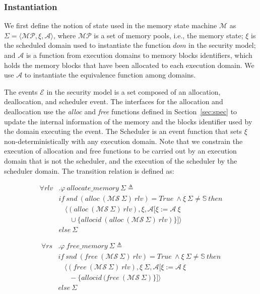 \subsubsection{Instantiation}

We first define the notion of state used in the memory state machine $\mathcal{M}$ as $\Sigma = \langle \mathcal{MP}, \xi, \mathcal{A} \rangle$, where $\mathcal{MP}$ is a set of memory pools, i.e., the memory state; $\xi$ is the scheduled domain used to instantiate the function $dom$ in the security model; and $\mathcal{A}$ is a function from execution domains to memory blocks identifiers, which holds the memory blocks that have been allocated to each execution domain. We use  $\mathcal{A}$  to instantiate the equivalence function among domains.


The events $\mathcal{E}$ in the security model is a set composed of an allocation, deallocation, and scheduler event. The interfaces for the allocation and deallocation use the \emph{alloc} and \emph{free} functions defined in Section~\ref{sec:spec} to update the internal information of the memory and the blocks identifier used by the domain executing the event. The Scheduler is an event function that sets $\xi$ non-deterministically with any execution domain. Note that we constrain the execution of allocation and free functions to be carried out by an execution domain that is not the scheduler, and the execution of the scheduler by the scheduler domain. The transition relation is defined as:

\begin{definition} 
{
\begin{align*}
\forall rlv&. \varphi\ allocate\_memory\ \Sigma \triangleq \\ 
&if\ snd\ (alloc\ (\mathcal{MS}\ \Sigma)\ rlv) = True\ \wedge \xi\ \Sigma \neq \mathbb{S}\ then \\
&\ \ \ \  \langle (alloc\ (\mathcal{MS}\ \Sigma)\ rlv), \xi, \mathcal{A}[\xi := \mathcal{A}\ \xi \\
&\ \ \ \ \ \ \ \cup \lbrace allocid\ (alloc\ (\mathcal{MS}\ \Sigma)\ rlv) \rbrace] \rangle \\
&else\ \Sigma
\end{align*}
}
\end{definition}

\begin{definition} 

{
\begin{align*}
\forall rs&. \varphi\ free\_memory\ \Sigma \triangleq \\ 
&if\ snd\ (free\ (\mathcal{MS}\ \Sigma)\ rlv) = True\  \wedge \xi\ \Sigma \neq \mathbb{S}\ then \\
&\ \ \ \  \langle (free\ (\mathcal{MS}\ \Sigma)\ rlv), \xi\ \Sigma, \mathcal{A}[\xi := \mathcal{A}\ \xi \\
&\ \ \ \ \ \ \ - \lbrace allocid\ (free\ (\mathcal{MS}\ \Sigma) \rbrace] \rangle \\
&else\ \Sigma
\end{align*}
}
\end{definition}

